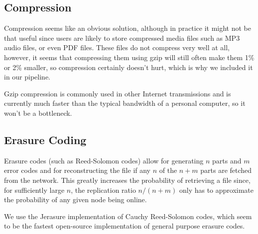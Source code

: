 \documentclass{acm_}
\begin{document}
\subsection{Compression}

Compression seems like an obvious solution, although in practice it might not be that useful since users are likely to store compressed media files such as MP3 audio files, or even PDF files. These files do not compress very well at all, however, it seems that compressing them using gzip will still often make them 1\% or 2\% smaller\cite{compression_comparison}, so compression certainly doesn't hurt, which is why we included it in our pipeline.

Gzip compression is commonly used in other Internet transmissions and is currently much faster than the typical bandwidth of a personal computer, so it won't be a bottleneck.

\subsection{Erasure Coding}

Erasure codes (such as Reed-Solomon codes) allow for generating $n$ parts and $m$ error codes and for reconstructing the file if any $n$ of the $n + m$ parts are fetched from the network. This greatly increases the probability of retrieving a file since, for sufficiently large $n$, the replication ratio $n/(n+m)$ only has to approximate the probability of any given node being online. 

We use the Jerasure implementation of Cauchy Reed-Solomon codes, which seem to be the fastest open-source implementation of general purpose erasure codes\cite{comparison_reed_solomon}. 
\end{document}
